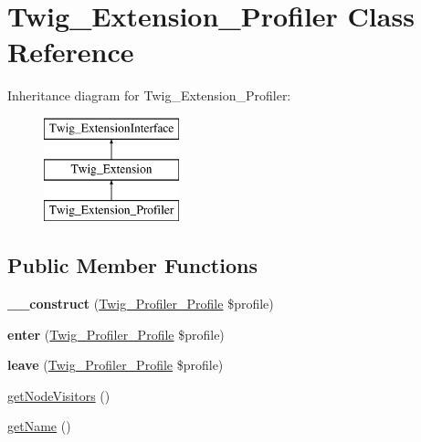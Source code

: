 \hypertarget{class_twig___extension___profiler}{}\section{Twig\+\_\+\+Extension\+\_\+\+Profiler Class Reference}
\label{class_twig___extension___profiler}
Inheritance diagram for Twig\+\_\+\+Extension\+\_\+\+Profiler\+:\begin{figure}[H]
\begin{center}
\leavevmode
\includegraphics[height=3.000000cm]{class_twig___extension___profiler}
\end{center}
\end{figure}
\subsection*{Public Member Functions}
\begin{DoxyCompactItemize}
\item 
\hypertarget{class_twig___extension___profiler_a3b5dad7ab6b7cb707d4eca5924056097}{}{\bfseries \+\_\+\+\_\+construct} (\hyperlink{class_twig___profiler___profile}{Twig\+\_\+\+Profiler\+\_\+\+Profile} \$profile)\label{class_twig___extension___profiler_a3b5dad7ab6b7cb707d4eca5924056097}

\item 
\hypertarget{class_twig___extension___profiler_a3a42b840e1e27ee2e33dd7c683cbbd16}{}{\bfseries enter} (\hyperlink{class_twig___profiler___profile}{Twig\+\_\+\+Profiler\+\_\+\+Profile} \$profile)\label{class_twig___extension___profiler_a3a42b840e1e27ee2e33dd7c683cbbd16}

\item 
\hypertarget{class_twig___extension___profiler_acd089b6d450b7d15f411f5d66a0a832f}{}{\bfseries leave} (\hyperlink{class_twig___profiler___profile}{Twig\+\_\+\+Profiler\+\_\+\+Profile} \$profile)\label{class_twig___extension___profiler_acd089b6d450b7d15f411f5d66a0a832f}

\item 
\hyperlink{class_twig___extension___profiler_aec02093179d390d22ae4083f23a1d74a}{get\+Node\+Visitors} ()
\item 
\hyperlink{class_twig___extension___profiler_a3d0963e68bb313b163a73f2803c64600}{get\+Name} ()
\end{DoxyCompactItemize}


